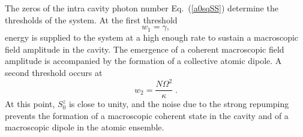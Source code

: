 \documentclass[aps,
twocolumn,
showpacs,
superscriptaddress,groupedaddress]{revtex4}
\begin{document}
The zeros of the intra cavity photon number Eq.~(\ref{a0sqSS}) determine
the thresholds of the system.  At the first threshold
\begin{equation}
w_1 = \gamma,
\label{FirstThreshold}
\end{equation} 
energy is supplied to the system at a high enough rate to sustain a
macroscopic field amplitude in the cavity.  The emergence of a coherent
macroscopic field amplitude is accompanied by the formation of a
collective atomic dipole.  A second threshold occurs at
\begin{equation}
w_2 =  \frac{N \Omega^2}{\kappa}\;.
\end{equation} 
At this point, $S_0^{z}$ is close to unity, and the noise due to the
strong repumping prevents the formation of a macroscopic coherent state
in the cavity and of a macroscopic dipole in the atomic ensemble.
\end{document}
